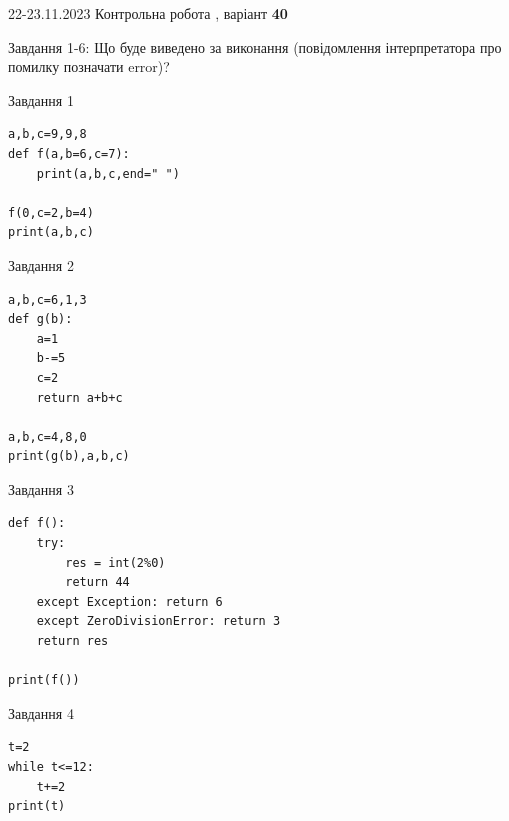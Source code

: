\documentclass[12pt, ukrainian]{article}
\begin{document}
{{22-23.11.2023 Контрольна робота , варіант  \No \textbf { 40 }\par}}
{

Завдання 1-6: Що буде виведено за виконання (повідомлення інтерпретатора про помилку позначати error)?


\begin{minipage}[t]{9.7cm}                
{\begin{center}Завдання {1}\end{center}}
\begin{verbatim}
a,b,c=9,9,8
def f(a,b=6,c=7):
    print(a,b,c,end=" ")

f(0,c=2,b=4)
print(a,b,c)
\end{verbatim}     
\end{minipage}
\vline \hspace{8mm}
\begin{minipage}[t]{8.0cm}                
{\begin{center}Завдання {2}\end{center}}
\begin{verbatim}
a,b,c=6,1,3
def g(b):
    a=1
    b-=5
    c=2
    return a+b+c

a,b,c=4,8,0
print(g(b),a,b,c)
\end{verbatim}     
\end{minipage}

\vspace{15mm}
\begin{minipage}[t]{9.7cm}                
{\begin{center}Завдання {3}\end{center}}
\begin{verbatim}
def f():
    try:
        res = int(2%0)
        return 44
    except Exception: return 6
    except ZeroDivisionError: return 3
    return res

print(f())
\end{verbatim}     
\end{minipage}
\vline \hspace{8mm}
\begin{minipage}[t]{8.0cm}                
{\begin{center}Завдання {4}\end{center}}
\begin{verbatim}
t=2
while t<=12:
    t+=2
print(t)
\end{verbatim}     
\end{minipage}

}
\end{document}
